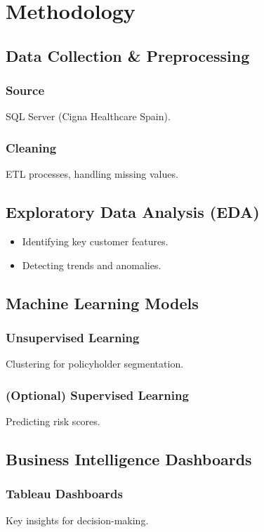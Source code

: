 \chapter{Methodology}


\section{Data Collection \& Preprocessing}
\subsection{Source}
SQL Server (Cigna Healthcare Spain).
\subsection{Cleaning}
ETL processes, handling missing values.

\section{Exploratory Data Analysis (EDA)}
\begin{itemize}
    \item Identifying key customer features.
    \item Detecting trends and anomalies.
\end{itemize}

\section{Machine Learning Models}
\subsection{Unsupervised Learning}
Clustering for policyholder segmentation.
\subsection{(Optional) Supervised Learning}
Predicting risk scores.

\section{Business Intelligence Dashboards}
\subsection{Tableau Dashboards}
Key insights for decision-making.
